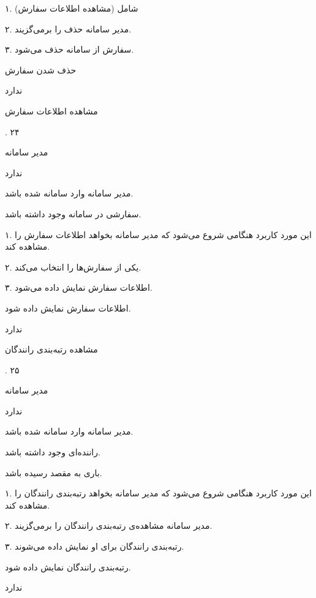
۱. شامل (مشاهده اطلاعات سفارش)

۲. مدیر سامانه حذف را برمی‌گزیند.

۳. سفارش از سامانه حذف می‌شود.

حذف شدن سفارش

ندارد

\noindent \hrulefill

مشاهده اطلاعات سفارش

.
۲۴

مدیر سامانه

ندارد


مدیر سامانه وارد سامانه شده باشد.

سفارشی در سامانه وجود داشته باشد.


۱. این مورد کاربرد هنگامی شروع می‌شود که مدیر سامانه بخواهد اطلاعات سفارش را مشاهده کند.

۲. یکی از سفارش‌ها را انتخاب می‌کند.

۳. اطلاعات سفارش نمایش داده می‌شود.

اطلاعات سفارش نمایش داده شود.

ندارد

\noindent \hrulefill

مشاهده رتبه‌بندی رانندگان

.
۲۵

مدیر سامانه

ندارد


مدیر سامانه وارد سامانه شده باشد.

راننده‌ای وجود داشته باشد.

باری به مقصد رسیده باشد.


۱. این مورد کاربرد هنگامی شروع می‌شود که مدیر سامانه بخواهد رتبه‌بندی رانندگان را مشاهده کند.

۲. مدیر سامانه مشاهده‌ی رتبه‌بندی رانندگان را برمی‌گزیند.

۳. رتبه‌بندی رانندگان برای او نمایش داده می‌شوند.

رتبه‌بندی رانندگان نمایش داده شود.

ندارد

